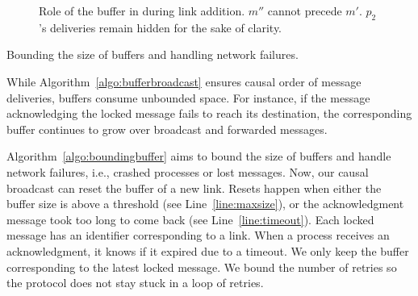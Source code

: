 \begin{figure}
  \begin{center}
    
    \caption{\label{fig:buffer}Role of the buffer in \CBROADCAST during link
      addition. $m''$ cannot precede $m'$. $p_2$'s deliveries remain hidden for
      the sake of clarity.}
  \end{center}
\end{figure}



\begin{algorithm}
  
  \caption{\label{algo:boundingbuffer}Bounding the size of buffers and handling
    network failures.}
\end{algorithm}

While Algorithm~\ref{algo:bufferbroadcast} ensures causal order of message
deliveries, buffers consume unbounded space. For instance, if the message
acknowledging the locked message fails to reach its destination, the
corresponding buffer continues to grow over broadcast and forwarded messages. 

Algorithm~\ref{algo:boundingbuffer} aims to bound the size of buffers and handle
network failures, i.e., crashed processes or lost messages. Now, our causal
broadcast can reset the buffer of a new link. Resets happen when either the
buffer size is above a threshold (see Line~\ref{line:maxsize}), or the
acknowledgment message took too long to come back (see
Line~\ref{line:timeout}). Each locked message has an identifier corresponding to
a link. When a process receives an acknowledgment, it knows if it expired due to
a timeout. We only keep the buffer corresponding to the latest locked
message. We bound the number of retries so the protocol does not stay stuck in a
loop of retries.

